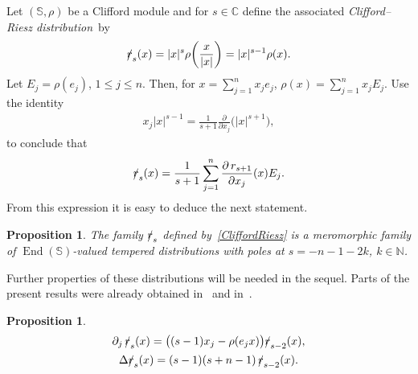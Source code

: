\documentclass[pdftex]{sigma}
\DeclareMathOperator{\End}{End}
\newcommand{\fsl}[1]{{\slashed{#1}}} %
\numberwithin{equation}{section}
\newtheorem{prop}[theor]{Proposition}
\begin{document}
Let $(\mathbb S, \rho)$ be a Clifford module and for $s\in \mathbb C$ define the associated \emph{Clifford--Riesz distribu\-tion}~by
\begin{gather}\label{CliffordRiesz}
\fsl{r}_s(x) = \vert x\vert^s \rho\bigg(\frac{x}{\vert x\vert}\bigg)= \vert x\vert^{s-1} \rho(x) .
\end{gather}
Let $E_j = \rho(e_j)$, $1\leq j\leq n$. Then, for $x=\sum_{j=1}^n x_je_j$, $\rho(x) = \sum_{j=1}^n x_j E_j$. Use the identity
\begin{gather*}
x_j \vert x\vert^{s-1} = \frac{1}{s+1} \frac{\partial}{\partial x_j} \big(\vert x\vert^{s+1}\big) ,
\end{gather*}
to conclude that
\begin{gather*}
\fsl{r}_s(x) = \frac{1}{s+1} \sum_{j=1}^n \frac{\partial \,r_{s+1}}{\partial x_j} (x) E_j .
\end{gather*}
From this expression it is easy to deduce the next statement.
\begin{prop} The family $\fsl{r}_s$ defined by~\eqref{CliffordRiesz} is a meromorphic family of $\End(\mathbb S)$-valued tempered distributions with poles at $s=-n-1-2k$, $k\in \mathbb N$.
\end{prop}
Further properties of these distributions will be needed in the sequel. Parts of the present results were already obtained in~\cite{co} and in~\cite{fos}.
\begin{prop}
\begin{gather}%
\partial_j\, \fsl{r}_s(x) = \big((s-1)x_j-\rho(e_jx)\big) \fsl{r}_{s-2}(x),\label{partial1}
\\
\Delta \fsl{r}_s(x) = (s-1)(s+n-1)\, \fsl{r}_{s-2}(x).\label{partial2}
\end{gather}

\end{prop}
\end{document}
